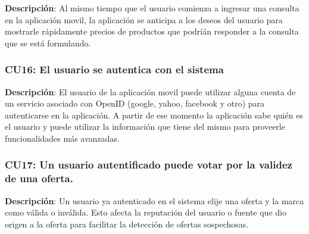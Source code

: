 \textbf{Descripción}: Al mismo tiempo que el usuario comienza a ingresar
una consulta en la aplicación movil, la aplicación se anticipa a los
deseos del usuario para mostrarle rápidamente precios de productos que
podríán responder a la consulta que se está formulando.

\subsubsection{CU16: El usuario se autentica con el sistema}

\textbf{Descripción}: El usuario de la aplicación movil puede utilizar
alguna cuenta de un servicio asociado con OpenID (google, yahoo,
facebook y otro) para autenticarse en la aplicación. A partir de ese
momento la aplicación sabe quién es el usuario y puede utilizar la
información que tiene del mismo para proveerle funcionalidades más
avanzadas.

\subsubsection{CU17: Un usuario autentificado puede votar por la validez
de una oferta.}

\textbf{Descripción}: Un usuario ya autenticado en el sistema elije una
oferta y la marca como válida o inválida. Esto afecta la reputación del
usuario o fuente que dio origen a la oferta para facilitar la detección
de ofertas sospechosas.
